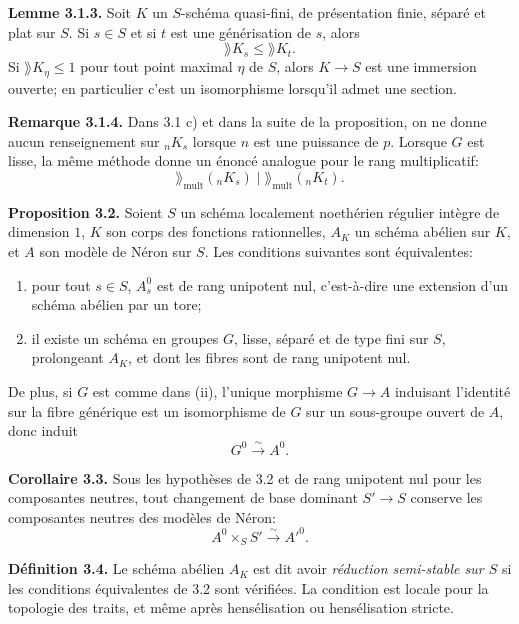 \documentclass[11pt]{article}
\begin{document}
\textbf{Lemme 3.1.3.} Soit \(K\) un \(S\)-schéma quasi-fini, de présentation finie, séparé et plat sur \(S\).  Si \(s\in S\) et si \(t\) est une générisation de \(s\), alors
\[
        \rang K_s\leq \rang K_t.
\]
Si \(\rang K_\eta\leq 1\) pour tout point maximal \(\eta\) de \(S\), alors \(K\to S\) est une immersion ouverte; en particulier c'est un isomorphisme lorsqu'il admet une section.

\textbf{Remarque 3.1.4.} Dans 3.1 c) et dans la suite de la proposition, on ne donne aucun renseignement sur \({}_nK_s\) lorsque \(n\) est une puissance de \(p\).  Lorsque \(G\) est lisse, la même méthode donne un énoncé analogue pour le rang multiplicatif:
\begin{equation}\tag{3.1.4.1}
        \rang_{\mathrm{mult}}({}_nK_s)\mid \rang_{\mathrm{mult}}({}_nK_t).
\end{equation}

\textbf{Proposition 3.2.} Soient \(S\) un schéma localement noethérien régulier intègre de dimension \(1\), \(K\) son corps des fonctions rationnelles, \(A_K\) un schéma abélien sur \(K\), et \(A\) son modèle de Néron sur \(S\).  Les conditions suivantes sont équivalentes:
\begin{enumerate}[label=(\roman*)]
\item pour tout \(s\in S\), \(A_s^0\) est de rang unipotent nul, c'est-à-dire une extension d'un schéma abélien par un tore;
\item il existe un schéma en groupes \(G\), lisse, séparé et de type fini sur \(S\), prolongeant \(A_K\), et dont les fibres sont de rang unipotent nul.
\end{enumerate}
De plus, si \(G\) est comme dans (ii), l'unique morphisme \(G\to A\) induisant l'identité sur la fibre générique est un isomorphisme de \(G\) sur un sous-groupe ouvert de \(A\), donc induit
\[
        G^0\xrightarrow{\sim}A^0.
\]

\textbf{Corollaire 3.3.} Sous les hypothèses de 3.2 et de rang unipotent nul pour les composantes neutres, tout changement de base dominant \(S'\to S\) conserve les composantes neutres des modèles de Néron:
\begin{equation}\tag{3.3.1}
        A^0\times_SS'\xrightarrow{\sim}A'^{0}.
\end{equation}

\textbf{Définition 3.4.} Le schéma abélien \(A_K\) est dit avoir \emph{réduction semi-stable sur \(S\)} si les conditions équivalentes de 3.2 sont vérifiées.  La condition est locale pour la topologie des traits, et même après hensélisation ou hensélisation stricte.
\end{document}
